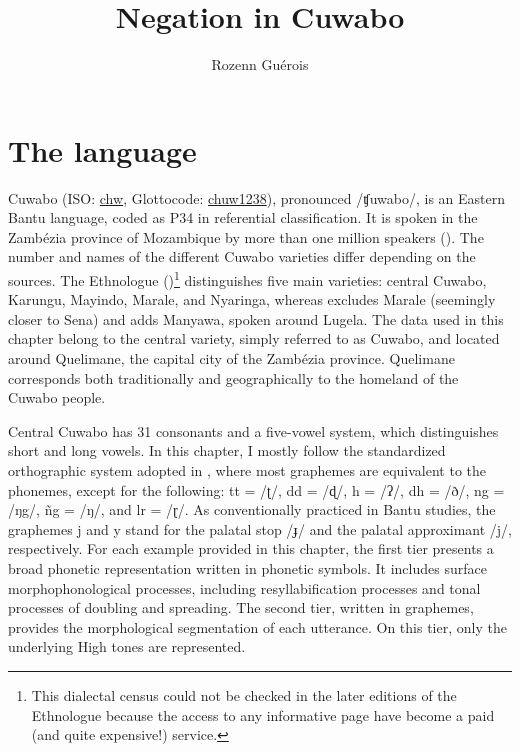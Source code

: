 \documentclass[output=paper,colorlinks=true, citecolor=brown,draftmode]{langscibook}
\author{Rozenn Guérois\affiliation{CNRS-LLACAN, Paris; University of KwaZulu-Natal}}
\title{Negation in Cuwabo}
\begin{document}
\maketitle 

\section{The language}\label{sec:cuw:1}
Cuwabo (ISO: \href{https://iso639-3.sil.org/code/chw}{chw}, Glottocode: \href{https://glottolog.org/resource/languoid/id/chuw1238}{chuw1238}), pronounced /ʧuwabo/, is an Eastern Bantu language, coded as P34 in  referential classification.
It is spoken in the Zambézia province of Mozambique by more than one million speakers (\citealt{InstitutoNacionaldeEstatísticas2017}). The number and names of the different Cuwabo varieties differ depending on the sources. The Ethnologue (\citealt{LewisEtAl2014})\footnote{This dialectal census could not be checked in the later editions of the Ethnologue because the access to any informative page have become a paid (and quite expensive!) service.}  distinguishes five main varieties: central Cuwabo, Karungu, Mayindo, Marale, and Nyaringa, whereas \citet{Guérois2015} excludes Marale (seemingly closer to Sena) and adds Manyawa, spoken around Lugela. The data used in this chapter belong to the central variety, simply referred to as Cuwabo, and located around Quelimane, the capital city of the Zambézia province. Quelimane corresponds both traditionally and geographically to the homeland of the Cuwabo people. 

Central Cuwabo has 31 consonants and a five-vowel system, which distinguishes short and long vowels. In this chapter, I mostly follow the standardized orthographic system adopted in \citet{NgungaFaquir2011}, where most graphemes are equivalent to the phonemes, except for the following: tt = /ʈ/, dd = /ɖ/, h = /ʔ/, dh = /ð/, ng = /ŋg/, ñg = /ŋ/, and lr = /ɽ/. As conventionally practiced in Bantu studies, the graphemes j and y stand for the palatal stop /ɟ/ and the palatal approximant /j/, respectively. For each example provided in this chapter, the first tier presents a broad phonetic representation written in phonetic symbols. It includes surface morphophonological processes, including resyllabification processes and tonal processes of doubling and spreading. The second tier, written in graphemes, provides the morphological segmentation of each utterance. On this tier, only the underlying High tones are represented. 
\end{document}
